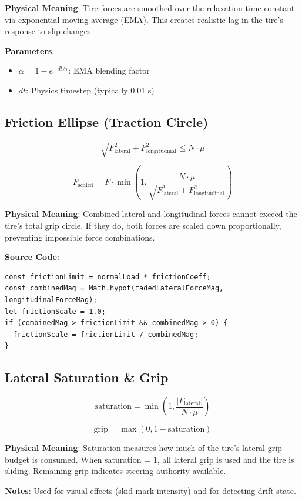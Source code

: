 \textbf{Physical Meaning}: Tire forces are smoothed over the relaxation time constant via exponential moving average (EMA). This creates realistic lag in the tire's response to slip changes.

\textbf{Parameters}:
\begin{itemize}
  \item $\alpha = 1 - e^{-dt/\tau}$: EMA blending factor
  \item $dt$: Physics timestep (typically 0.01 s)
\end{itemize}

\subsection{Friction Ellipse (Traction Circle)}

\begin{equation}
  \sqrt{F_{\text{lateral}}^2 + F_{\text{longitudinal}}^2} \leq N \cdot \mu
  \label{eq:friction-ellipse}
\end{equation}

\begin{equation}
  F_{\text{scaled}} = F \cdot \min\left(1, \frac{N \cdot \mu}{\sqrt{F_{\text{lateral}}^2 + F_{\text{longitudinal}}^2}}\right)
  \label{eq:friction-scaling}
\end{equation}

\textbf{Physical Meaning}: Combined lateral and longitudinal forces cannot exceed the tire's total grip circle. If they do, both forces are scaled down proportionally, preventing impossible force combinations.

\textbf{Source Code}: 

\begin{lstlisting}[caption={Friction ellipse clipping}]
const frictionLimit = normalLoad * frictionCoeff;
const combinedMag = Math.hypot(fadedLateralForceMag, longitudinalForceMag);
let frictionScale = 1.0;
if (combinedMag > frictionLimit && combinedMag > 0) {
  frictionScale = frictionLimit / combinedMag;
}
\end{lstlisting}

\subsection{Lateral Saturation \& Grip}

\begin{equation}
  \text{saturation} = \min\left(1, \frac{|F_{\text{lateral}}|}{N \cdot \mu}\right)
  \label{eq:lateral-saturation}
\end{equation}

\begin{equation}
  \text{grip} = \max(0, 1 - \text{saturation})
  \label{eq:grip-remaining}
\end{equation}

\textbf{Physical Meaning}: Saturation measures how much of the tire's lateral grip budget is consumed. When saturation = 1, all lateral grip is used and the tire is sliding. Remaining grip indicates steering authority available.

\textbf{Notes}: Used for visual effects (skid mark intensity) and for detecting drift state.

\newpage
